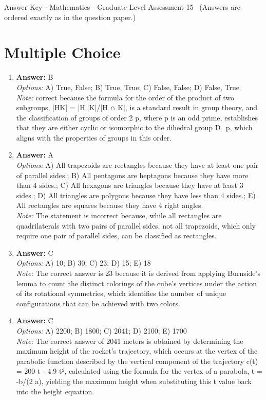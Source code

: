 \documentclass[12pt]{article}
\begin{document}
\begin{center}
Answer Key - Mathematics - Graduate Level Assessment 15 \
\small (Answers are ordered exactly as in the question paper.)
\end{center}

\section*{Multiple Choice}
\begin{enumerate}[label=\arabic*.]
\item \textbf{Answer:} B
\\ \textit{Options:} A) True, False; B) True, True; C) False, False; D) False, True
\\ \textit{Note:} correct because the formula for the order of the product of two subgroups, |HK| = |H||K|/|H ∩ K|, is a standard result in group theory, and the classification of groups of order 2 p, where p is an odd prime, establishes that they are either cyclic or isomorphic to the dihedral group D\_p, which aligns with the properties of groups in this order.
\item \textbf{Answer:} A
\\ \textit{Options:} A) All trapezoids are rectangles because they have at least one pair of parallel sides.; B) All pentagons are heptagons because they have more than 4 sides.; C) All hexagons are triangles because they have at least 3 sides.; D) All triangles are polygons because they have less than 4 sides.; E) All rectangles are squares because they have 4 right angles.
\\ \textit{Note:} The statement is incorrect because, while all rectangles are quadrilaterals with two pairs of parallel sides, not all trapezoids, which only require one pair of parallel sides, can be classified as rectangles.
\item \textbf{Answer:} C
\\ \textit{Options:} A) 10; B) 30; C) 23; D) 15; E) 18
\\ \textit{Note:} The correct answer is 23 because it is derived from applying Burnside's lemma to count the distinct colorings of the cube's vertices under the action of its rotational symmetries, which identifies the number of unique configurations that can be achieved with two colors.
\item \textbf{Answer:} C
\\ \textit{Options:} A) 2200; B) 1800; C) 2041; D) 2100; E) 1700
\\ \textit{Note:} The correct answer of 2041 meters is obtained by determining the maximum height of the rocket's trajectory, which occurs at the vertex of the parabolic function described by the vertical component of the trajectory c(t) = 200 t - 4.9 t², calculated using the formula for the vertex of a parabola, t = -b/(2 a), yielding the maximum height when substituting this t value back into the height equation.

\end{enumerate}
\end{document}
